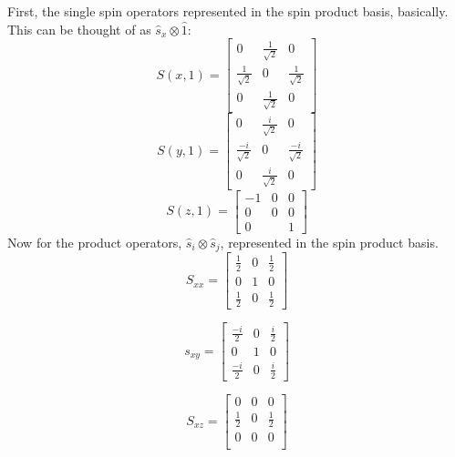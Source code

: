 \documentclass[12pt]{article}
\begin{document}
First, the single spin operators represented in the spin product basis,
basically. This can be thought of as $\hat{s}_{x}\otimes \hat{1} $:
\begin{equation}
S(x,1) = 
\begin{bmatrix}
0                  & \frac{1}{\sqrt{2}} & 0\\
\frac{1}{\sqrt{2}} & 0                 & \frac{1}{\sqrt{2}} \\ 
0                  & \frac{1}{\sqrt{2}} & 0
\end{bmatrix}
\end{equation}
\begin{equation}
S(y,1) = 
\begin{bmatrix}
0                  & \frac{i}{\sqrt{2}} & 0\\
\frac{-i}{\sqrt{2}} & 0                 & \frac{-i}{\sqrt{2}} \\ 
0                  & \frac{i}{\sqrt{2}} & 0
\end{bmatrix}
\end{equation}
\begin{equation}
S(z,1) = 
\begin{bmatrix}
-1                  & 0 & 0\\
0 & 0               & 0    \\ 
0                   &   & 1
\end{bmatrix}
\end{equation}
Now for the product operators, $\hat{s}_{i}\otimes\hat{s}_{j}$, represented in the
spin product basis.
\begin{equation}
S_{xx} = 
\begin{bmatrix}
\frac{1}{2} & 0  & \frac{1}{2} \\ 
0           & 1 & 0\\
\frac{1}{2} & 0  & \frac{1}{2} 
\end{bmatrix}
\end{equation}

\begin{equation}
s_{xy} = 
\begin{bmatrix}
\frac{-i}{2} & 0  & \frac{i}{2} \\ 
0           & 1 & 0\\
\frac{-i}{2} & 0  & \frac{i}{2} 
\end{bmatrix}
\end{equation}

\begin{equation}
S_{xz} = 
\begin{bmatrix}
0           & 0 & 0\\
\frac{1}{2} & 0  & \frac{1}{2} \\ 
0           & 0 & 0\\
\end{bmatrix}
\end{equation}
\end{document}
